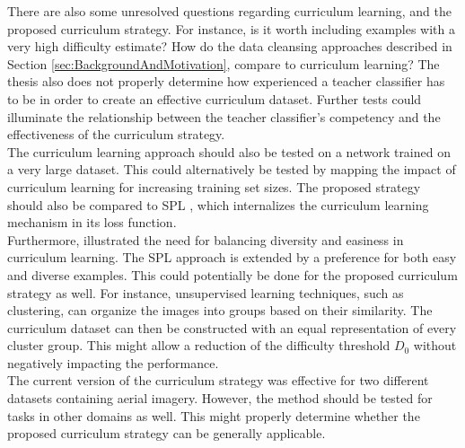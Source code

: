 There are also some unresolved questions regarding curriculum learning, and the proposed curriculum strategy. For instance, is it worth including examples with a very high difficulty estimate? How do the data cleansing approaches described in Section \ref{sec:BackgroundAndMotivation}, compare to curriculum learning? The thesis also does not properly determine how experienced a teacher classifier has to be in order to create an effective curriculum dataset. Further tests could illuminate the relationship between the teacher classifier's competency and the effectiveness of the curriculum strategy.  \\

The curriculum learning approach should also be tested on a network trained on a very large dataset. This could alternatively be tested by mapping the impact of curriculum learning for increasing training set sizes. The proposed strategy should also be compared to \ac{SPL} \citep{Kumar_self_paced_learning}, which internalizes the curriculum learning mechanism in its loss function.\\

Furthermore, \cite{Lu_self-paced_learning_diversity} illustrated the need for balancing diversity and easiness in curriculum learning. The \ac{SPL} approach is extended by a preference for both easy and diverse examples. This could potentially be done for the proposed curriculum strategy as well. For instance, unsupervised learning techniques, such as clustering, can organize the images into groups based on their similarity. The curriculum dataset can then be constructed with an equal representation of every cluster group. This might allow a reduction of the difficulty threshold $D_0$ without negatively impacting the performance.\\

The current version of the curriculum strategy was effective for two different datasets containing aerial imagery. However, the method should be tested for tasks in other domains as well. This might properly determine whether the proposed curriculum strategy can be generally applicable.\\
 

